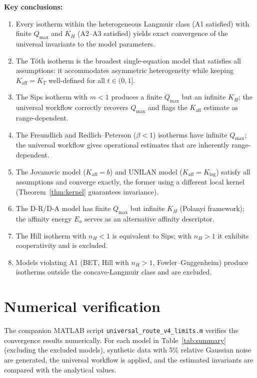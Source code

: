 \documentclass[12pt]{article}
\begin{document}
\textbf{Key conclusions:}
\begin{enumerate}[nosep]
  \item Every isotherm within the heterogeneous Langmuir class
        (A1 satisfied) with finite $Q_{\max}$ and $K_H$
        (A2--A3 satisfied) yields exact convergence of the
        universal invariants to the model parameters.
  \item The T\'oth isotherm is the broadest single-equation model
        that satisfies all assumptions: it accommodates asymmetric
        heterogeneity while keeping $K_{\mathrm{aff}}=K_T$
        well-defined for all $t\in(0,1]$.
  \item The Sips isotherm with $m<1$ produces a finite
        $Q_{\max}$ but an infinite $K_H$; the universal workflow
        correctly recovers $Q_{\max}$ and flags the
        $K_{\mathrm{aff}}$ estimate as range-dependent.
  \item The Freundlich and Redlich--Peterson ($\beta<1$) isotherms
        have infinite $Q_{\max}$; the universal workflow gives
        operational estimates that are inherently range-dependent.
  \item The Jovanovic model ($K_{\mathrm{aff}} = b$) and UNILAN model
        ($K_{\mathrm{aff}} = K_{\log}$) satisfy all assumptions
        and converge exactly, the former using a different local
        kernel (Theorem~\ref{thm:kernel} guarantees invariance).
  \item The D-R/D-A model has finite $Q_{\max}$ but infinite $K_H$
        (Polanyi framework); the affinity energy $E_a$ serves as an
        alternative affinity descriptor.
  \item The Hill isotherm with $n_H < 1$ is equivalent to Sips;
        with $n_H > 1$ it exhibits cooperativity and is excluded.
  \item Models violating A1 (BET, Hill with $n_H>1$,
        Fowler--Guggenheim) produce isotherms outside the
        concave-Langmuir class and are excluded.
\end{enumerate}

\section{Numerical verification}
\label{sec:numerical}

The companion MATLAB script
\texttt{universal\_route\_v4\_limits.m} verifies the
convergence results numerically.  For each model in
Table~\ref{tab:summary} (excluding the excluded models), synthetic
data with 5\% relative Gaussian noise are generated, the universal
workflow is applied, and the estimated invariants are compared with
the analytical values.
\end{document}
